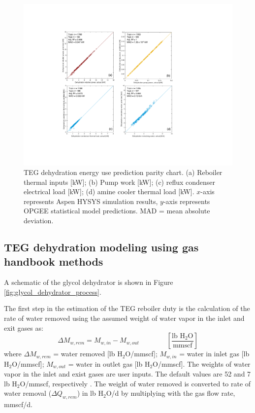 \documentclass[11pt]{report}
\newcommand{\eqnunitfrac}[2]{\quad\quad \scriptstyle{\left[\frac{\text{#1}}{\text{#2}}\right]}}
\begin{document}
\begin{figure}
\includegraphics[width=1\columnwidth]{images/DehydrationParity.pdf}
\caption{TEG dehydration energy use prediction parity chart. (a) Reboiler thermal inputs [kW]; (b) Pump work [kW]; (c) reflux condenser electrical load [kW]; (d) amine cooler thermal load [kW]. $x$-axis represents Aspen HYSYS simulation results, $y$-axis represents OPGEE statistical model predictions. MAD = mean absolute deviation.}
\label{fig:DehydrationParity}
\end{figure}



\subsection{TEG dehydration modeling using gas handbook methods}

A schematic of the glycol dehydrator is shown in Figure\,\ref{fig:glycol_dehydrator_process}.

The first step in the estimation of the TEG reboiler duty is the calculation of the rate of water removed using the assumed weight of water vapor in the inlet and exit gases as:
\begin{equation} \label{eq:water_removed}
\Delta M_{w,rem}= M_{w,in} - M_{w,out} \quad\quad\eqnunitfrac{lb H$_{2}$O}{mmscf} 
\end{equation}
where $\Delta M_{w,rem}$ = water removed [lb H$_{2}$O/mmscf]; $M_{w,in}$ = water in inlet gas [lb H$_{2}$O/mmscf]; $M_{w,out}$ = water in outlet gas [lb H$_{2}$O/mmscf]. The weights of water vapor in the inlet and exist gases are user inputs. The default values are 52 and 7 lb H$_{2}$O/mmscf, respectively \cite[p. 160]{Manning1991}. The weight of water removed is converted to rate of water removal ($\Delta Q_{w,rem}$) in lb H$_{2}$O/d by multiplying with the gas flow rate, mmscf/d.
\end{document}
